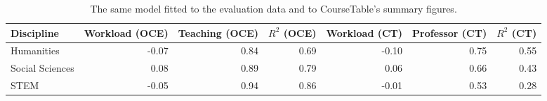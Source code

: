 \begin{table}[h]
  \centering
  \caption{The same model fitted to the evaluation data and to CourseTable's summary figures.}
  \label{tab:compare}
\begin{tabular}{lrrrrrr}
\toprule
Discipline & Workload (OCE) & Teaching (OCE) & $R^2$ (OCE) & Workload (CT) & Professor (CT) & $R^2$ (CT) \\
\midrule
Humanities & -0.07 & 0.84 & 0.69 & -0.10 & 0.75 & 0.55 \\
Social Sciences & 0.08 & 0.89 & 0.79 & 0.06 & 0.66 & 0.43 \\
STEM & -0.05 & 0.94 & 0.86 & -0.01 & 0.53 & 0.28 \\
\bottomrule
\end{tabular}
\end{table}
